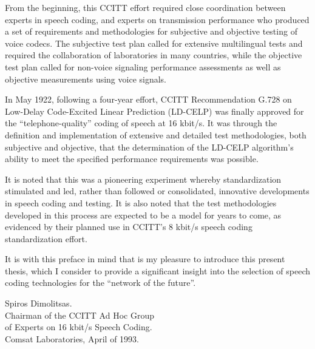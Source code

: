 From the beginning, this CCITT effort required close coordination
between experts in speech coding, and experts on transmission
performance who produced a set of requirements and methodologies for
subjective and objective testing of voice codecs. The subjective test
plan called for extensive multilingual tests and required the
collaboration of laboratories in many countries, while the objective
test plan called for non-voice signaling performance assessments as
well as objective measurements using voice signals.

In May 1922, following a four-year effort, CCITT Recommendation G.728
on Low-Delay Code-Excited Linear Prediction (LD-CELP) was finally
approved for the ``telephone-quality'' coding of speech at 16 kbit/s.
It was through the definition and implementation of extensive and
detailed test methodologies, both subjective and objective, that the
determination of the LD-CELP algorithm's ability to meet the specified
performance requirements was possible.

It is noted that this was a pioneering experiment whereby
standardization stimulated and led, rather than followed or
consolidated, innovative developments in speech coding and testing. It
is also noted that the test methodologies developed in this process are
expected to be a model for years to come, as evidenced by their planned
use in CCITT's 8 kbit/s speech coding standardization effort.

It is with this preface in mind that is my pleasure to introduce this
present thesis, which I consider to provide a significant insight into
the selection of speech coding technologies for the ``network of the
future''.

\begin{flushright}
Spiros Dimolitsas.\\
Chairman of the CCITT Ad Hoc Group \\
of Experts on 16 kbit/s Speech Coding.\\
Comsat Laboratories, April of 1993.
\end{flushright}

\newpage
\thispagestyle{empty}

\mbox{}


